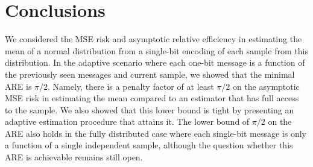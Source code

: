 \documentclass[letterpaper, conference]{IEEEtran}      %
\begin{document}
\section{Conclusions \label{sec:conclusions}}
We considered the MSE risk and asymptotic relative efficiency in estimating the mean of a normal distribution from a single-bit encoding of each sample from this distribution. In the adaptive scenario where each one-bit message is a function of the previously seen messages and current sample, we showed that the minimal ARE is $\pi/2$. Namely, there is a penalty factor of at least $\pi/2$ on the asymptotic MSE risk in estimating the mean compared to an estimator that has full access to the sample. We also showed that this lower bound is tight by presenting an adaptive estimation procedure that attains it. The lower bound of $\pi/2$ on the ARE also holds in the fully distributed case where each single-bit message is only a function of a single independent sample, although the question whether this ARE is achievable remains still open. 




\appendix
\end{document}
